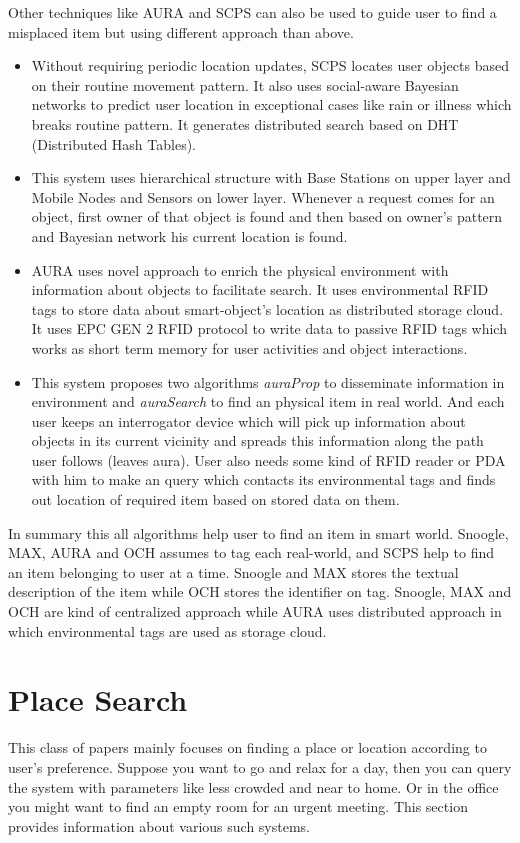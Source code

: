 \documentclass [a4paper,12pt]{book}
\begin{document}
Other techniques like AURA\cite{18} and SCPS\cite{19} can also be used to guide user to find a misplaced item but using different approach than above. 
\begin{itemize}
\item Without requiring periodic location updates, SCPS locates user objects based on their routine movement pattern. It also uses social-aware Bayesian networks to predict user location in exceptional cases like rain or illness which breaks routine pattern. It generates distributed search based on DHT (Distributed Hash Tables). 

\item This system uses hierarchical structure with Base Stations on upper layer and Mobile Nodes and Sensors on lower layer. Whenever a request comes for an object, first owner of that object is found and then based on owner's pattern and Bayesian network his current location is found.

\item AURA uses novel approach to enrich the physical environment with information about objects to facilitate search. It uses environmental RFID tags to store data about smart-object's location as distributed storage cloud. It uses EPC GEN 2 RFID protocol to write data to passive RFID tags which works as short term memory for user activities and object interactions. 

\item This system proposes two algorithms \emph{auraProp} to disseminate information in environment and \emph{auraSearch} to find an physical item in real world. And each user keeps an interrogator device which will pick up information about objects in its current vicinity and spreads this information along the path user follows (leaves aura). User also needs some kind of RFID reader or PDA with him to make an query which contacts its environmental tags and finds out location of required item based on stored data on them.
\end{itemize}

In summary this all algorithms help user to find an item in smart world. Snoogle, MAX, AURA and OCH assumes to tag each real-world, and SCPS help to find an item belonging to user at a time. Snoogle and MAX stores the textual description of the item while OCH stores the identifier on tag. Snoogle, MAX and OCH are kind of centralized approach while AURA uses distributed approach in which environmental tags are used as storage cloud.

\section{Place Search}
This class of papers mainly focuses on finding a place or location according to user's preference. 
Suppose you want to go and relax for a day, then you can query the system with parameters like less crowded and near to home. Or in the office you might want to find an empty room for an urgent meeting. This section provides information about various such systems.
\end{document}
